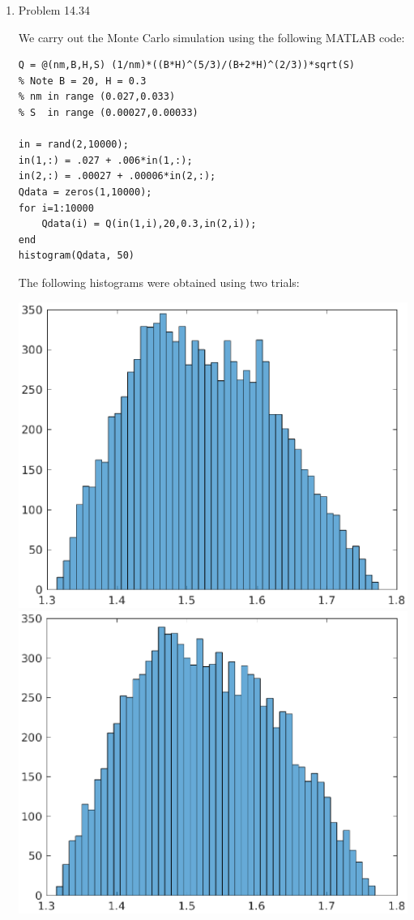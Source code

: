 \documentclass[12pt]{amsart}
\begin{document}
\begin{enumerate}
\vfill
\pagebreak









\item Problem 14.34

\vspace{5mm}

We carry out the Monte Carlo simulation using the
following MATLAB code:

\vspace{1cm}

\begin{verbatim}
Q = @(nm,B,H,S) (1/nm)*((B*H)^(5/3)/(B+2*H)^(2/3))*sqrt(S)
% Note B = 20, H = 0.3
% nm in range (0.027,0.033)
% S  in range (0.00027,0.00033)

in = rand(2,10000);
in(1,:) = .027 + .006*in(1,:);
in(2,:) = .00027 + .00006*in(2,:);
Qdata = zeros(1,10000);
for i=1:10000
    Qdata(i) = Q(in(1,i),20,0.3,in(2,i));
end
histogram(Qdata, 50)
\end{verbatim}

\vspace{1cm}

The following histograms were obtained using
two trials:

\includegraphics[width=.5\textwidth]{p2histA.eps}
\includegraphics[width=.5\textwidth]{p2histB.eps}







\end{enumerate}
\end{document}
